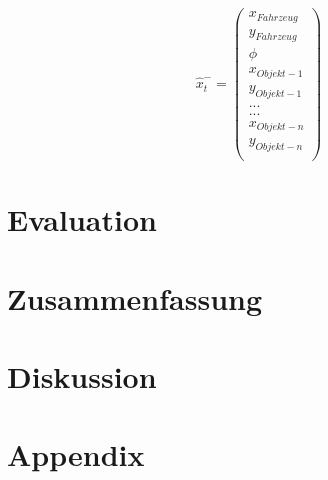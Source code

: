 \documentclass[11pt]{article}
\begin{document}
\begin{equation}\label{SLAM-State-Vector}
	\hat{x}_t^- = \begin{pmatrix}
		x_{Fahrzeug} \\
		y_{Fahrzeug} \\
		\phi \\
		x_{Objekt-1} \\
		y_{Objekt-1} \\
		... \\
		... \\
		x_{Objekt-n} \\
		y_{Objekt-n} \\
	  \end{pmatrix}
\end{equation}

\section{Evaluation}

\section{Zusammenfassung}\label{Zusammenfassung}

\section{Diskussion}\label{Diskussion}

\section{Appendix}\label{Appendix}




\end{document}
